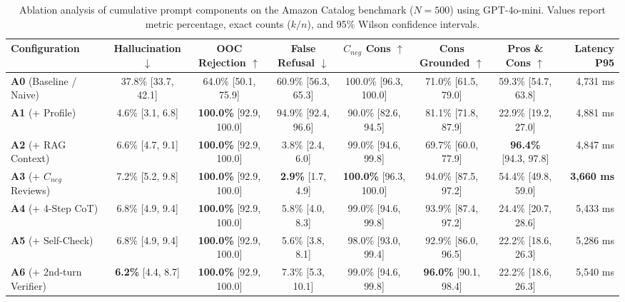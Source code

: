 
\begin{table}[t]
\centering
\caption{Ablation analysis of cumulative prompt components on the Amazon Catalog benchmark ($N=500$) using GPT-4o-mini. Values report metric percentage, exact counts ($k/n$), and 95\% Wilson confidence intervals.}
\label{tab:ablation_study_gpt4o_mini}
\small
\begin{tabular}{lccccccr}
\toprule
\textbf{Configuration} & \textbf{Hallucination $\downarrow$} & \textbf{OOC Rejection $\uparrow$} & \textbf{False Refusal $\downarrow$} & \textbf{$C_{neg}$ Cons $\uparrow$} & \textbf{Cons Grounded $\uparrow$} & \textbf{Pros \& Cons $\uparrow$} & \textbf{Latency P95} \\
\midrule
\textbf{A0} (Baseline / Naive) & 37.8\% [33.7, 42.1] & 64.0\% [50.1, 75.9] & 60.9\% [56.3, 65.3] & 100.0\% [96.3, 100.0] & 71.0\% [61.5, 79.0] & 59.3\% [54.7, 63.8] & 4,731 ms \\
\textbf{A1} (+ Profile) & 4.6\% [3.1, 6.8] & \textbf{100.0\%} [92.9, 100.0] & 94.9\% [92.4, 96.6] & 90.0\% [82.6, 94.5] & 81.1\% [71.8, 87.9] & 22.9\% [19.2, 27.0] & 4,881 ms \\
\textbf{A2} (+ RAG Context) & 6.6\% [4.7, 9.1] & \textbf{100.0\%} [92.9, 100.0] & 3.8\% [2.4, 6.0] & 99.0\% [94.6, 99.8] & 69.7\% [60.0, 77.9] & \textbf{96.4\%} [94.3, 97.8] & 4,847 ms \\
\textbf{A3} (+ $C_{neg}$ Reviews) & 7.2\% [5.2, 9.8] & \textbf{100.0\%} [92.9, 100.0] & \textbf{2.9\%} [1.7, 4.9] & \textbf{100.0\%} [96.3, 100.0] & 94.0\% [87.5, 97.2] & 54.4\% [49.8, 59.0] & \textbf{3,660 ms} \\
\textbf{A4} (+ 4-Step CoT) & 6.8\% [4.9, 9.4] & \textbf{100.0\%} [92.9, 100.0] & 5.8\% [4.0, 8.3] & 99.0\% [94.6, 99.8] & 93.9\% [87.4, 97.2] & 24.4\% [20.7, 28.6] & 5,433 ms \\
\textbf{A5} (+ Self-Check) & 6.8\% [4.9, 9.4] & \textbf{100.0\%} [92.9, 100.0] & 5.6\% [3.8, 8.1] & 98.0\% [93.0, 99.4] & 92.9\% [86.0, 96.5] & 22.2\% [18.6, 26.3] & 5,286 ms \\
\textbf{A6} (+ 2nd-turn Verifier) & \textbf{6.2\%} [4.4, 8.7] & \textbf{100.0\%} [92.9, 100.0] & 7.3\% [5.3, 10.1] & 99.0\% [94.6, 99.8] & \textbf{96.0\%} [90.1, 98.4] & 22.2\% [18.6, 26.3] & 5,540 ms \\
\bottomrule
\end{tabular}
\end{table}
